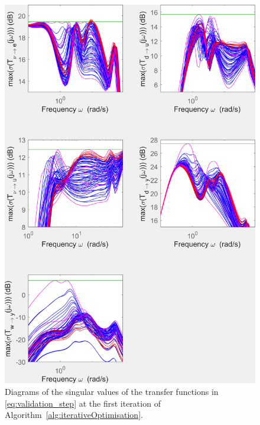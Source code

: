 \begin{figure}[ht]
    \centering
    \includegraphics[trim=0cm 0cm 0cm 0cm,clip,width=0.9\columnwidth]{figures/transferts_tcst.png}
    \caption{Diagrams of the singular values of the transfer functions in \eqref{eq:validation_step} at the first iteration of Algorithm~\ref{alg:iterativeOptimisation}.}
    \label{fig:transferts_tcst}
\end{figure}


